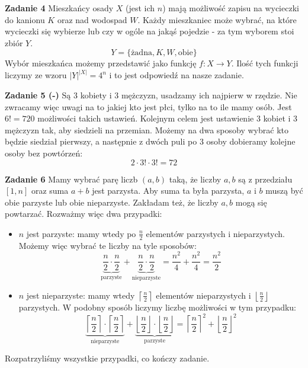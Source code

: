 \documentclass[a4paper,12pt]{article}
\newcommand{\floor}[1]{\left\lfloor #1 \right\rfloor}
\newcommand{\ceil}[1]{\left\lceil #1 \right\rceil}
\newcommand{\pair}[1]{\left( #1 \right)}
\begin{document}
\noindent \newline \textbf{Zadanie 4} \newline
Mieszkańcy osady $X$ (jest ich $n$) mają możliwość zapisu na wycieczki do kanionu $K$ oraz nad wodospad $W$. Każdy mieszkaniec może wybrać, na które wycieczki się wybierze lub czy w ogóle na jakąś pojedzie - za tym wyborem stoi zbiór $Y$. 
$$Y =\{\text{żadna}, K, W, \text{obie}\}$$
Wybór mieszkańca możemy przedstawić jako funkcję $f: X \to Y$. Ilość tych funkcji liczymy ze wzoru $|Y|^{|X|} = 4^n$ i to jest odpowiedź na nasze zadanie.

\noindent \newline \textbf{Zadanie 5 (-)} \newline
Są 3 kobiety i 3 mężczyzn, usadzamy ich najpierw w rzędzie. Nie zwracamy więc uwagi na to jakiej kto jest płci, tylko na to ile mamy osób. Jest $6! = 720$ możliwości takich ustawień. Kolejnym celem jest ustawienie 3 kobiet i 3 mężczyzn tak, aby siedzieli na przemian. Możemy na dwa sposoby wybrać kto będzie siedział pierwszy, a następnie z dwóch puli po 3 osoby dobieramy kolejne osoby bez powtórzeń:
$$2 \cdot 3! \cdot 3! = 72$$ 

\noindent \newline \textbf{Zadanie 6} \newline
Mamy wybrać parę liczb $\pair{a,b}$ taką, że liczby $a, b$ są z przedziału $[1, n]$ oraz suma $a+b$ jest parzysta. Aby suma ta była parzysta, $a$ i $b$ muszą być obie parzyste lub obie nieparzyste. Zakładam też, że liczby $a, b$ mogą się powtarzać. Rozważmy więc dwa przypadki:
\begin{itemize}
\item $n$ jest parzyste: mamy wtedy po $\frac{n}{2}$ elementów parzystych i nieparzystych. Możemy więc wybrać te liczby na tyle sposobów:
$$\underbrace{\frac{n}{2}\cdot\frac{n}{2}}_{\text{parzyste}} + \underbrace{\frac{n}{2}\cdot\frac{n}{2}}_{\text{nieparzyste}} = \frac{n^2}{4} + \frac{n^2}{4} = \frac{n^2}{2}$$
\item $n$ jest nieparzyste: mamy wtedy $\ceil{\frac{n}{2}}$ elementów nieparzystych i $\floor{\frac{n}{2}}$ parzystych. W podobny sposób liczymy liczbę możliwości w tym przypadku:
$$\underbrace{\ceil{\frac{n}{2}}\cdot\ceil{\frac{n}{2}}}_{\text{nieparzyste}} + \underbrace{\floor{\frac{n}{2}}\cdot\floor{\frac{n}{2}}}_{\text{parzyste}} = \ceil{\frac{n}{2}}^2 + \floor{\frac{n}{2}}^2$$
\end{itemize}
\noindent Rozpatrzyliśmy wszystkie przypadki, co kończy zadanie.
\end{document}
